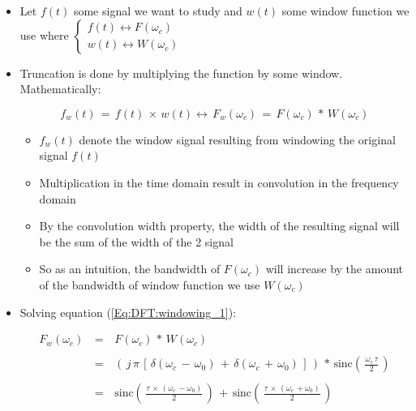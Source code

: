 \begin{itemize}

\item Let $f(t)$ some signal we want to study and $w(t)$ some window function we use where $\begin{cases}
f(t) \leftrightarrow F(\omega_c) \\
w(t) \leftrightarrow W(\omega_c) 
\end{cases}$

\item Truncation is done by multiplying the function by some window. Mathematically: 


\begin{equation}
f_w(t) \, = \, f(t) \, \times \, w(t) \leftrightarrow \, F_w(\omega_c) \, = \, F(\omega_c) \, * \, W(\omega_c)
\label{Eq:DFT:windowing_1} 
\end{equation}

	\begin{itemize}
	
	\item $f_w(t)$ denote the window signal resulting from windowing the original signal $f(t)$
	
	\item Multiplication in the time domain result in convolution in the frequency domain
	
	\item By the convolution width property, the width of the resulting signal will be the sum of the width of the 2 signal
	
	\item So as an intuition, the bandwidth of $F(\omega_c)$ will increase by the amount of the bandwidth of window function we use $W(\omega_c)$
	\end{itemize}



\item Solving equation (\ref{Eq:DFT:windowing_1}):

\begin{equation}
\begin{array}{rcl}
F_w(\omega_c) \, &=& \, F(\omega_c) \, * \, W(\omega_c) \\ \\
				 &=& \, \left(\, j\,\pi \, \left[\, \delta(\omega_c \,- \, \omega_0) \, + \, \delta(\omega_c \,+ \, \omega_0)  \,\right]   \,\right) \, * \, \text{sinc} \left(\,\displaystyle\frac{\omega_c \, \tau}{2} \, \right) \\ \\
				&=& \, \text{sinc} \left(\,\displaystyle\frac{ \tau \, \times \, (\omega_c \, - \omega_0) }{2} \, \right) \, + \, \text{sinc} \left(\,\displaystyle\frac{ \tau \, \times \, (\omega_c \, + \omega_0) }{2} \, \right) 
\end{array}
\label{Eq:DFT:windowing_2}
\end{equation}


\end{itemize}
